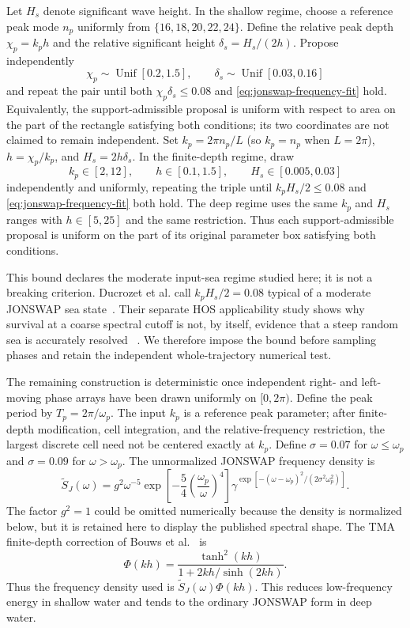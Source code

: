 \documentclass[10pt]{article}
\begin{document}
Let $H_s$ denote significant wave height.  In the shallow regime, choose a
reference peak mode
$n_p$ uniformly from $\{16,18,20,22,24\}$.  Define the relative peak depth
$\chi_p=k_ph$ and the relative significant height
$\delta_s=H_s/(2h)$.  Propose independently
\[
  \chi_p\sim\operatorname{Unif}[0.2,1.5],
  \qquad
  \delta_s\sim\operatorname{Unif}[0.03,0.16]
\]
and repeat the pair until both $\chi_p\delta_s\leq0.08$ and
\eqref{eq:jonswap-frequency-fit} hold.  Equivalently, the support-admissible
proposal is uniform with respect to area on the part of the rectangle
satisfying both conditions; its two coordinates are not claimed to remain
independent.  Set
$k_p=2\pi n_p/L$ (so $k_p=n_p$ when $L=2\pi$),
$h=\chi_p/k_p$, and $H_s=2h\delta_s$.
In the finite-depth regime, draw
\[
  k_p\in[2,12],\qquad h\in[0.1,1.5],\qquad H_s\in[0.005,0.03]
\]
independently and uniformly, repeating the triple until $k_pH_s/2\leq0.08$
and \eqref{eq:jonswap-frequency-fit} both hold.
The deep regime uses the same $k_p$ and $H_s$ ranges with $h\in[5,25]$ and
the same restriction.  Thus each support-admissible proposal is uniform on
the part of its original parameter box satisfying both conditions.

This bound declares the moderate input-sea regime studied here; it is not a
breaking criterion.  Ducrozet et al. call $k_pH_s/2=0.08$ typical of a
moderate JONSWAP sea state~\cite{ducrozet2021rogue}.  Their separate HOS
applicability study shows why survival at a coarse spectral cutoff is not, by
itself, evidence that a steep random sea is accurately resolved
~\cite{ducrozet2017applicability}.  We therefore impose the bound before
sampling phases and retain the independent whole-trajectory numerical test.

The remaining construction is deterministic once independent right- and
left-moving phase arrays have been drawn uniformly on $[0,2\pi)$.
Define the peak period by
$T_p=2\pi/\omega_p$.  The input $k_p$ is a reference peak parameter; after
finite-depth modification, cell integration, and the relative-frequency
restriction, the largest
discrete cell need not be centered exactly at $k_p$.  Define
$\sigma=0.07$ for $\omega\leq\omega_p$ and $\sigma=0.09$ for
$\omega>\omega_p$.  The unnormalized JONSWAP frequency density
is~\cite{hasselmann1973}
\begin{equation}
  \widetilde S_J(\omega)
  =
  g^2\omega^{-5}
  \exp\!\left[-\frac54\left(\frac{\omega_p}{\omega}\right)^4\right]
  \gamma^{
    \exp[-(\omega-\omega_p)^2/
      (2\sigma^2\omega_p^2)]
  }.
  \label{eq:jonswap}
\end{equation}
The factor $g^2=1$ could be omitted numerically because the density is
normalized below, but it is retained here to display the published spectral
shape.  The TMA finite-depth correction of Bouws et al.~\cite{bouws1985} is
\begin{equation}
  \Phi(kh)=
  \frac{\tanh^2(kh)}
       {1+2kh/\sinh(2kh)}.
  \label{eq:tma}
\end{equation}
Thus the frequency density used is
$\widetilde S_J(\omega)\Phi(kh)$.  This reduces low-frequency energy in
shallow water and tends to the ordinary JONSWAP form in deep water.
\end{document}
